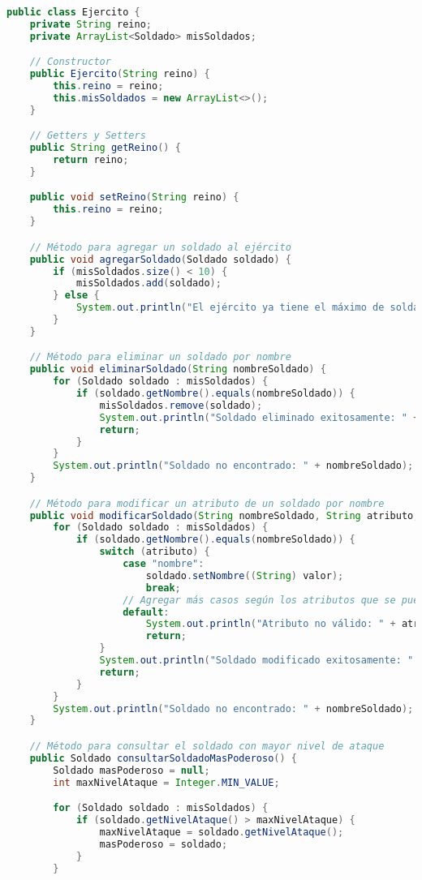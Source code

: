 \documentclass{article}
\begin{document}
\begin{itemize}
\begin{itemize}
\begin{lstlisting}[language=java]
public class Ejercito {
    private String reino;
    private ArrayList<Soldado> misSoldados;

    // Constructor
    public Ejercito(String reino) {
        this.reino = reino;
        this.misSoldados = new ArrayList<>();
    }

    // Getters y Setters
    public String getReino() {
        return reino;
    }

    public void setReino(String reino) {
        this.reino = reino;
    }

    // Método para agregar un soldado al ejército
    public void agregarSoldado(Soldado soldado) {
        if (misSoldados.size() < 10) {
            misSoldados.add(soldado);
        } else {
            System.out.println("El ejército ya tiene el máximo de soldados permitidos (10).");
        }
    }

    // Método para eliminar un soldado por nombre
    public void eliminarSoldado(String nombreSoldado) {
        for (Soldado soldado : misSoldados) {
            if (soldado.getNombre().equals(nombreSoldado)) {
                misSoldados.remove(soldado);
                System.out.println("Soldado eliminado exitosamente: " + nombreSoldado);
                return;
            }
        }
        System.out.println("Soldado no encontrado: " + nombreSoldado);
    }

    // Método para modificar un atributo de un soldado por nombre
    public void modificarSoldado(String nombreSoldado, String atributo, Object valor) {
        for (Soldado soldado : misSoldados) {
            if (soldado.getNombre().equals(nombreSoldado)) {
                switch (atributo) {
                    case "nombre":
                        soldado.setNombre((String) valor);
                        break;
                    // Agregar más casos según los atributos que se puedan modificar
                    default:
                        System.out.println("Atributo no válido: " + atributo);
                        return;
                }
                System.out.println("Soldado modificado exitosamente: " + nombreSoldado);
                return;
            }
        }
        System.out.println("Soldado no encontrado: " + nombreSoldado);
    }

    // Método para consultar el soldado con mayor nivel de ataque
    public Soldado consultarSoldadoMasPoderoso() {
        Soldado masPoderoso = null;
        int maxNivelAtaque = Integer.MIN_VALUE;

        for (Soldado soldado : misSoldados) {
            if (soldado.getNivelAtaque() > maxNivelAtaque) {
                maxNivelAtaque = soldado.getNivelAtaque();
                masPoderoso = soldado;
            }
        }


\end{lstlisting}
\end{itemize}
\end{itemize}
\end{document}
